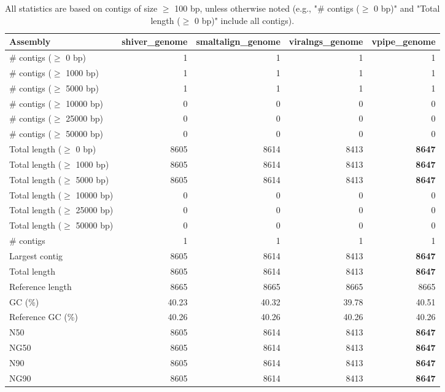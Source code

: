 \documentclass[12pt,a4paper]{article}
\begin{document}
\begin{table}[ht]
\begin{center}
\caption{All statistics are based on contigs of size $\geq$ 100 bp, unless otherwise noted (e.g., "\# contigs ($\geq$ 0 bp)" and "Total length ($\geq$ 0 bp)" include all contigs).}
\begin{tabular}{|l*{4}{|r}|}
\hline
Assembly & shiver\_genome & smaltalign\_genome & viralngs\_genome & vpipe\_genome \\ \hline
\# contigs ($\geq$ 0 bp) & 1 & 1 & 1 & 1 \\ \hline
\# contigs ($\geq$ 1000 bp) & 1 & 1 & 1 & 1 \\ \hline
\# contigs ($\geq$ 5000 bp) & 1 & 1 & 1 & 1 \\ \hline
\# contigs ($\geq$ 10000 bp) & 0 & 0 & 0 & 0 \\ \hline
\# contigs ($\geq$ 25000 bp) & 0 & 0 & 0 & 0 \\ \hline
\# contigs ($\geq$ 50000 bp) & 0 & 0 & 0 & 0 \\ \hline
Total length ($\geq$ 0 bp) & 8605 & 8614 & 8413 & {\bf 8647} \\ \hline
Total length ($\geq$ 1000 bp) & 8605 & 8614 & 8413 & {\bf 8647} \\ \hline
Total length ($\geq$ 5000 bp) & 8605 & 8614 & 8413 & {\bf 8647} \\ \hline
Total length ($\geq$ 10000 bp) & 0 & 0 & 0 & 0 \\ \hline
Total length ($\geq$ 25000 bp) & 0 & 0 & 0 & 0 \\ \hline
Total length ($\geq$ 50000 bp) & 0 & 0 & 0 & 0 \\ \hline
\# contigs & 1 & 1 & 1 & 1 \\ \hline
Largest contig & 8605 & 8614 & 8413 & {\bf 8647} \\ \hline
Total length & 8605 & 8614 & 8413 & {\bf 8647} \\ \hline
Reference length & 8665 & 8665 & 8665 & 8665 \\ \hline
GC (\%) & 40.23 & 40.32 & 39.78 & 40.51 \\ \hline
Reference GC (\%) & 40.26 & 40.26 & 40.26 & 40.26 \\ \hline
N50 & 8605 & 8614 & 8413 & {\bf 8647} \\ \hline
NG50 & 8605 & 8614 & 8413 & {\bf 8647} \\ \hline
N90 & 8605 & 8614 & 8413 & {\bf 8647} \\ \hline
NG90 & 8605 & 8614 & 8413 & {\bf 8647} \\ \hline

\end{tabular}
\end{center}
\end{table}
\end{document}
